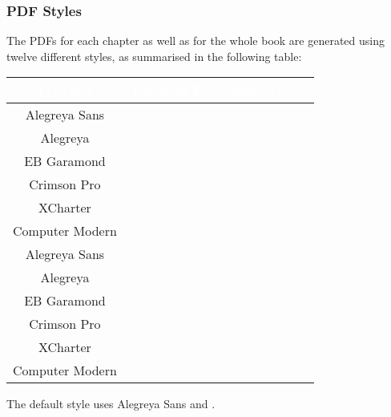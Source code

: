 \subsubsection{PDF Styles}\label{subsubsection-pdf-styles}
The PDFs for each chapter as well as for the whole book are generated using twelve different styles, as summarised in the following table:
\begingroup%
\renewcommand{\arraystretch}{1.2}
\begin{center}
    \begin{tabular}{|Sc|Sc|}\hline{}
        \textcolor{white}{\textbf{Typeface}} & \textcolor{white}{\textbf{Theorem Environments}}\\\hline{}
        Alegreya Sans                        &                                    \\
        Alegreya                             &                                    \\
        EB Garamond                          &                                    \\
        Crimson Pro                          &                                    \\
        XCharter                             &                                    \\
        Computer Modern                      &                                    \\
        Alegreya Sans                        &                                    \\
        Alegreya                             &                                    \\
        EB Garamond                          &                                    \\
        Crimson Pro                          &                                    \\
        XCharter                             &                                    \\
        Computer Modern                      &                                    \\\hline
    \end{tabular}
\end{center}
\endgroup
The default style uses Alegreya Sans and .
